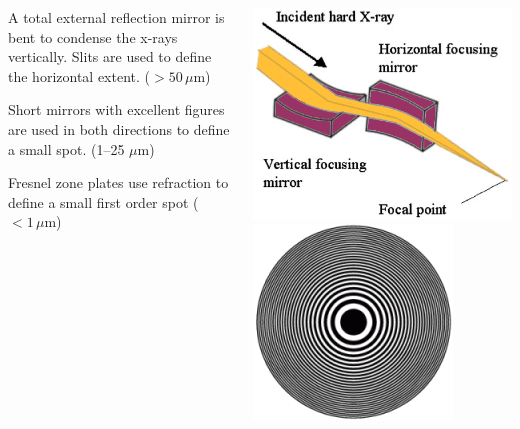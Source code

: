 \documentclass[10pt, xcolor=x11names, compress]{beamer}
\begin{document}
\begin{frame}
  \begin{columns}
    \begin{column}{0.6\linewidth}
      \begin{description}[Refrac]
      \item[1D focussing + slits] A total external reflection mirror
        is bent to condense the x-rays vertically.  Slits are used to
        define the horizontal extent. ($>50\,\mu$m)
      \item[Kirkpatrick-Baez mirrors] Short mirrors with excellent
        figures are used in both directions to define a small
        spot. (1--25 $\mu$m)
      \item[Refractive optics] Fresnel zone plates use refraction to
        define a small first order spot ($<1\,\mu$m)
      \end{description}
    \end{column}
    \begin{column}{0.4\linewidth}
      \begin{center}
        \includegraphics[width=0.9\linewidth]{xrf/kb.png}\\[1ex]
        \includegraphics[width=0.7\linewidth]{xrf/zp.png}
      \end{center}

    \end{column}
  \end{columns}
\end{frame}
\end{document}
